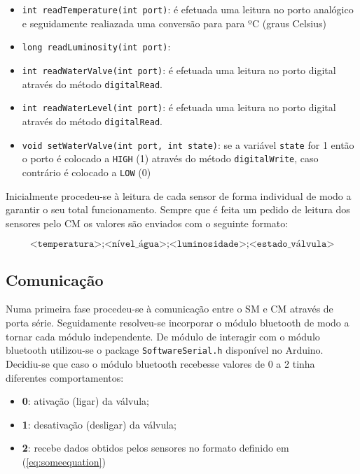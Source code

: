 \begin{itemize}
	\item \texttt{int readTemperature(int port)}: é efetuada uma leitura no porto analógico e seguidamente realiazada uma conversão para para ºC (graus Celsius)
	
	\item \texttt{long readLuminosity(int port)}: 
	
	\item \texttt{int readWaterValve(int port)}: é efetuada uma leitura no porto digital através do método \texttt{digitalRead}. 
	
	\item \texttt{int readWaterLevel(int port)}: é efetuada uma leitura no porto digital através do método \texttt{digitalRead}.
	
	
	\item \texttt{void setWaterValve(int port, int state)}: se a variável \texttt{state} for 1 então o porto é colocado a \texttt{HIGH} (1) através do método \texttt{digitalWrite}, caso contrário é colocado a \texttt{LOW} (0)
	
\end{itemize}

Inicialmente procedeu-se à leitura de cada sensor de forma individual de modo a garantir o seu total funcionamento. Sempre que é feita um pedido de leitura dos sensores pelo \ac{CM} os valores são enviados com o seguinte formato: 

\begin{equation} 
\label{eq:someequation}
\texttt{<temperatura>;<nível\_água>;<luminosidade>;<estado\_válvula>}
\end{equation}

\subsection{Comunicação}


Numa primeira fase procedeu-se à comunicação entre o \ac{SM} e \ac{CM} através de porta série. Seguidamente resolveu-se incorporar o módulo bluetooth de modo a tornar cada módulo independente. De módulo de interagir com o módulo bluetooth utilizou-se o package \texttt{SoftwareSerial.h} disponível no Arduino. Decidiu-se que caso o módulo bluetooth recebesse valores de 0 a 2 tinha diferentes comportamentos: 

\begin{itemize}
	\item \textbf{0}: ativação (ligar) da válvula; 
	\item \textbf{1}: desativação (desligar) da válvula; 
	\item \textbf{2}: recebe dados obtidos pelos sensores no formato definido em (\ref{eq:someequation})
\end{itemize}

